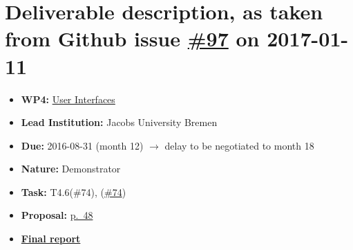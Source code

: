 \section*{\texorpdfstring{Deliverable description, as taken from Github
issue
\href{https://github.com/OpenDreamKit/OpenDreamKit/issues/91}{\#97} on
2017-01-11}{Deliverable description, as taken from Github issue \#97 on 2017-01-11}}\label{deliverable-description-as-taken-from-github-issue-97-on-2017-01-11}

\begin{itemize}
\tightlist
\item
  \textbf{WP4:}
  \href{https://github.com/OpenDreamKit/OpenDreamKit/tree/master/WP4}{User
  Interfaces}
\item
  \textbf{Lead Institution:} Jacobs University Bremen
\item
  \textbf{Due:} 2016-08-31 (month 12) $\rightarrow$ delay to be negotiated to month 18
\item
  \textbf{Nature:} Demonstrator
\item
  \textbf{Task:}  T4.6(\#74), 
  (\href{https://github.com/OpenDreamKit/OpenDreamKit/issues/74}{\#74})  
\item
  \textbf{Proposal:}
  \href{https://github.com/OpenDreamKit/OpenDreamKit/raw/master/Proposal/proposal-www.pdf}{p.~48}
\item
  \textbf{\href{https://github.com/OpenDreamKit/OpenDreamKit/raw/master/WP4/D4.9/report-final.pdf}{Final
  report}}
\end{itemize}


